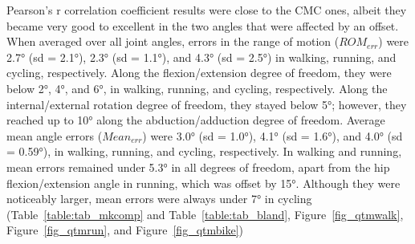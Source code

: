   Pearson’s r correlation coefficient results were close to the CMC ones, albeit they became very good to excellent in the two angles that were affected by an offset. When averaged over all joint angles, errors in the range of motion (\(ROM_{err}\)) were 2.7° (sd = 2.1°), 2.3° (sd = 1.1°), and 4.3° (sd = 2.5°) in walking, running, and cycling, respectively. Along the flexion/extension degree of freedom, they were below 2°, 4°, and 6°, in walking, running, and cycling, respectively. Along the internal/external rotation degree of freedom, they stayed below 5°; however, they reached up to 10° along the abduction/adduction degree of freedom. Average mean angle errors (\(Mean_{err}\)) were 3.0° (sd = 1.0°), 4.1° (sd = 1.6°), and 4.0° (sd = 0.59°), in walking, running, and cycling, respectively. In walking and running, mean errors remained under 5.3° in all degrees of freedom, apart from the hip flexion/extension angle in running, which was offset by 15°. Although they were noticeably larger, mean errors were always under 7° in cycling  (Table~\ref{table:tab_mkcomp} and Table~\ref{table:tab_bland}, Figure~\ref{fig_qtmwalk}, Figure~\ref{fig_qtmrun}, and Figure~\ref{fig_qtmbike})
    
